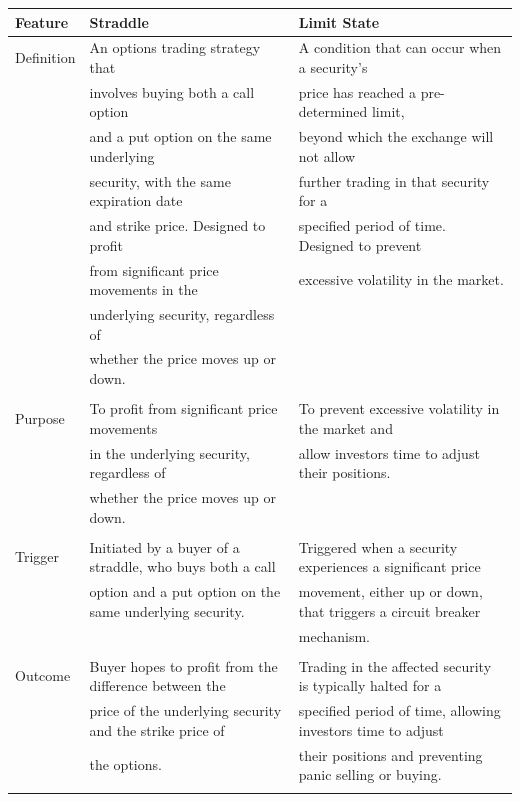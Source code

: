 \documentclass[11pt]{article}
\begin{document}
\begin{center}
\begin{tabular}{lll}
Feature & Straddle & Limit State\\[0pt]
\hline
Definition & An options trading strategy that & A condition that can occur when a security's\\[0pt]
 & involves buying both a call option & price has reached a pre-determined limit,\\[0pt]
 & and a put option on the same underlying & beyond which the exchange will not allow\\[0pt]
 & security, with the same expiration date & further trading in that security for a\\[0pt]
 & and strike price. Designed to profit & specified period of time. Designed to prevent\\[0pt]
 & from significant price movements in the & excessive volatility in the market.\\[0pt]
 & underlying security, regardless of & \\[0pt]
 & whether the price moves up or down. & \\[0pt]
 &  & \\[0pt]
Purpose & To profit from significant price movements & To prevent excessive volatility in the market and\\[0pt]
 & in the underlying security, regardless of & allow investors time to adjust their positions.\\[0pt]
 & whether the price moves up or down. & \\[0pt]
 &  & \\[0pt]
Trigger & Initiated by a buyer of a straddle, who buys both a call & Triggered when a security experiences a significant price\\[0pt]
 & option and a put option on the same underlying security. & movement, either up or down, that triggers a circuit breaker\\[0pt]
 &  & mechanism.\\[0pt]
 &  & \\[0pt]
Outcome & Buyer hopes to profit from the difference between the & Trading in the affected security is typically halted for a\\[0pt]
 & price of the underlying security and the strike price of & specified period of time, allowing investors time to adjust\\[0pt]
 & the options. & their positions and preventing panic selling or buying.\\[0pt]
 &  & \\[0pt]

\end{tabular}
\end{center}
\end{document}
